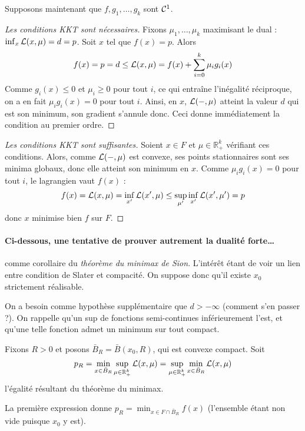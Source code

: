 \documentclass[a4paper, 11pt]{article}
\def\R{\mathbb{R}}
\def\L{{\cal{L}}}
\def\Cf{{\cal{C}}}
\begin{document}
Supposons maintenant que $f, g_1, \ldots, g_k$ sont $\Cf^1$. 
\begin{proof}[Les conditions KKT sont nécessaires]
  Fixons $\mu_1, \ldots, \mu_k$ maximisant le dual : $\inf_x \L(x, \mu) = d =
  p$. Soit $x$ tel que $f(x) = p$. Alors
  \[ f(x) = p = d \leq \L(x, \mu) = f(x) + \sum_{i=0}^k \mu_i g_i(x) \] Comme
  $g_i(x) \leq 0$ et $\mu_i \geq 0$ pour tout $i$, ce qui entraîne l'inégalité
  réciproque, on a en fait $\mu_i g_i(x) = 0$ pour tout $i$. Ainsi, en $x$,
  $\L(-, \mu)$ atteint la valeur $d$ qui est son minimum, son gradient s'annule
  donc. Ceci donne immédiatement la condition au premier ordre.
\end{proof}

\begin{proof}[Les conditions KKT sont suffisantes]
Soient $x \in F$ et $\mu \in \R_+^k$ vérifiant ces conditions. Alors, comme
$\L(-,\mu)$ est convexe, ses points stationnaires sont ses minima globaux, donc
elle atteint son minimum en $x$. Comme $\mu_i g_i(x) = 0$ pour tout $i$, le
lagrangien vaut $f(x)$ :
\[ f(x) = \L(x,\mu) = \inf_{x'} \L(x',\mu) \leq \sup_{\mu'} \inf_{x'}
  \L(x',\mu') = p
\]
donc $x$ minimise bien $f$ sur $F$.
\end{proof}

\paragraph{Ci-dessous, une tentative de prouver autrement la dualité forte…}
comme corollaire du \emph{théorème du minimax de Sion}. L'intérêt étant de voir
un lien entre condition de Slater et compacité. On suppose donc qu'il existe
$x_0$ strictement réalisable.

On a besoin comme hypothèse supplémentaire que $d > -\infty$ (comment s'en
passer ?). On rappelle qu'un sup de fonctions semi-continues inférieurement
l'est, et qu'une telle fonction admet un minimum sur tout compact.

Fixons $R > 0$ et posons $\bar{B}_R = \bar{B}(x_0,R)$, qui est convexe compact.
Soit
\[ p_R = \min_{x \in \bar{B}_R} \sup_{\mu \in \R_+^k} \L(x,\mu)
       = \sup_{\mu \in \R_+^k} \min_{x \in \bar{B}_R} \L(x,\mu) \]
l'égalité résultant du théorème du minimax.

La première expression donne $p_R = \min_{x \in F \cap \bar{B}_R} f(x)$
(l'ensemble étant non vide puisque $x_0$ y est).
\end{document}

